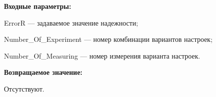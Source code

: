 \textbf{Входные параметры:}

ErrorR --- задаваемое значение надежности;
 
    Number\_Of\_Experiment --- номер комбинации вариантов настроек;
 
    Number\_Of\_Measuring --- номер измерения варианта настроек.

\textbf{Возвращаемое значение:}

Отсутствуют.